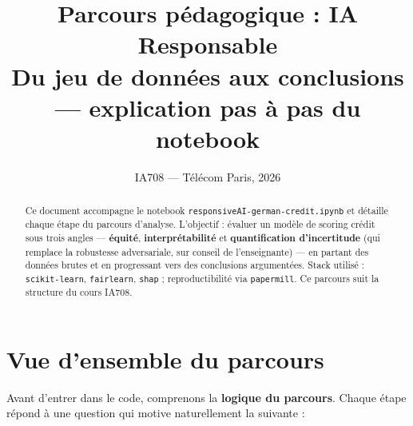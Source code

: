 \documentclass[11pt, a4paper]{article}
\title{\textbf{Parcours p\'{e}dagogique : IA Responsable\\[0.2em]
\large Du jeu de donn\'{e}es aux conclusions ---
explication pas \`{a} pas du notebook}}
\author{IA708 --- T\'{e}l\'{e}com Paris, 2026}
\date{}
\begin{document}
\maketitle
\vspace{-1em}

\begin{abstract}
\noindent Ce document accompagne le notebook \texttt{responsiveAI-german-credit.ipynb} et d\'{e}taille chaque \'{e}tape du parcours d'analyse. L'objectif : \'{e}valuer un mod\`{e}le de scoring cr\'{e}dit sous trois angles --- \textbf{\'{e}quit\'{e}}, \textbf{interpr\'{e}tabilit\'{e}} et \textbf{quantification d'incertitude} (qui remplace la robustesse adversariale, sur conseil de l'enseignante) --- en partant des donn\'{e}es brutes et en progressant vers des conclusions argument\'{e}es. Stack utilis\'{e} : \texttt{scikit-learn}, \texttt{fairlearn}, \texttt{shap} ; reproductibilit\'{e} via \texttt{papermill}. Ce parcours suit la structure du cours IA708.
\end{abstract}

\tableofcontents
\vspace{1em}

\section{Vue d'ensemble du parcours}
\label{sec:overview}

Avant d'entrer dans le code, comprenons la \textbf{logique du parcours}. Chaque \'{e}tape r\'{e}pond \`{a} une question qui motive naturellement la suivante :
\end{document}
